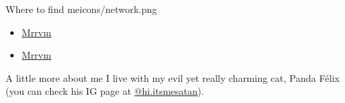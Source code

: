\documentclass{thepurplecv}
\begin{document}
\begin{purplesectionleft}{Where to find me}{icons/network.png}
{
\begin{itemize}[leftmargin=0cm,align=left]
\item[] \faGithub \hspace*{10pt} \href{https://github.com/mrrvm}{Mrrvm}
\item[] \faLinkedin \hspace*{10pt} \href{https://www.linkedin.com/in/mrrvm/}{Mrrvm}
\end{itemize}
}
\end{purplesectionleft}
\vspace*{29pt}
\begin{aboutme}{A little more about me}
{
I live with my evil yet really charming cat, Panda Félix (you can check his IG page at \href{https://www.instagram.com/hi.itsmesatan/}{@hi.itsmesatan}).
}
\end{aboutme}
\end{document}
